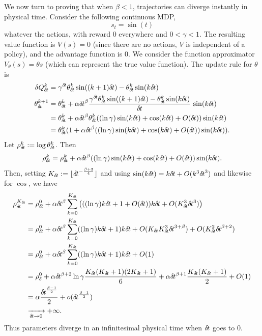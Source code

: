 We now turn to proving that when $\beta < 1$,
trajectories can diverge instantly in physical time. 
Consider the following continuous MDP, 
\begin{equation}
	s_t = \sin(t)
\end{equation}
whatever the actions,
with reward $0$ everywhere and $0 < \gamma < 1$.
The resulting value function is $V(s) = 0$ (since there
are no actions, $V$ is independent of a policy), and the advantage
function is $0$.
We consider the function approximator $V_\theta(s) = \theta s$ (which can
represent the true value function).
The update rule for $\theta$ is
\begin{align}
\delta Q_\deltat^k &= \gamma^\deltat \theta_\deltat^k \sin((k + 1)
\deltat) - \theta_\deltat^k \sin(k\deltat)\\
	\theta_\deltat^{k+1} &= \theta_\deltat^k + \alpha \deltat^\beta
	\frac{\gamma^\deltat \theta_\deltat^k \sin((k + 1) \deltat) -
	\theta_\deltat^k \sin(k\deltat)}{\deltat}\,\sin(k\deltat)\\
			     &= \theta_\deltat^k + \alpha \deltat^\beta
			     \theta_\deltat^k
			     ((\ln \gamma) \sin(k \deltat)
			     + \cos(k
			     \deltat)+\bigO(\deltat))\sin(k\deltat)\\
			     &= \theta_\deltat^k(1 + \alpha \deltat^\beta
			     ((\ln \gamma) \sin(k \deltat) + \cos(k
			     \deltat)+\bigO(\deltat))\sin(k\deltat)).
\end{align}
Let $\rho_{\delta\hspace{-.1em}t}^k \mathrel{\mathop{:}}= \log \theta_{\delta\hspace{-.1em}t}^k$. Then
\begin{align}
	\rho_{\delta\hspace{-.1em}t}^k = \rho_{\delta\hspace{-.1em}t}^k + \alpha {\delta\hspace{-.1em}t}^\beta ((\ln
	\gamma) \sin(k {\delta\hspace{-.1em}t}) + \cos(k
	{\delta\hspace{-.1em}t})+O({\delta\hspace{-.1em}t}))\sin(k{\delta\hspace{-.1em}t}).
\end{align}
Then, setting $K_{\delta\hspace{-.1em}t} \mathrel{\mathop{:}}= \lfloor {\delta\hspace{-.1em}t}^{-\frac{\beta +
3}{4}}\rfloor$ and using $\sin(k{\delta\hspace{-.1em}t})=k{\delta\hspace{-.1em}t}+O(k^3{\delta\hspace{-.1em}t}^3)$ and
likewise for $\cos$, we have
\begin{align}
	\rho_\deltat^{K_\deltat} &= \rho_\deltat^0 + \alpha \deltat^\beta
	\sum\limits_{k=0}^{K_\deltat} \left(((\ln \gamma)k\deltat +
	1+O(\deltat))k\deltat + \bigO(K_\deltat^3 \deltat^{3})\right)\\
	&= \rho_\deltat^0 + \alpha \deltat^\beta
	\sum\limits_{k=0}^{K_\deltat} ((\ln \gamma) k\deltat +
	1)k\deltat + \bigO(K_\deltat K_\deltat^3 \deltat^{3 + \beta}) +
	\bigO(K_\deltat^2 \deltat^{\beta+2})\\
				 &= \rho_\deltat^0 + \alpha \deltat^\beta
				 \sum\limits_{k=0}^{K_\deltat} ((\ln
				 \gamma) k\deltat + 1)k\deltat +
				 \bigO(1)\\
				 &= \rho_\delta^0 + \alpha\deltat^{\beta
				 + 2} \ln\gamma \frac{K_\deltat
				 (K_\deltat + 1) (2 K_\deltat + 1)}{6} +
				 \alpha \deltat^{\beta + 1}
				 \frac{K_\deltat (K_\deltat + 1)}{2} +
				 O(1)\\
				 &= \alpha \frac{\deltat^{\frac{\beta - 1}{2}}}{2} + \smallo(\deltat^{\frac{\beta - 1}{2}})\\
				 &\xrightarrow[\deltat\to 0]{} +\infty.
\end{align}
Thus parameters diverge in an infinitesimal physical time when ${\delta\hspace{-.1em}t}$ goes to $0$.

